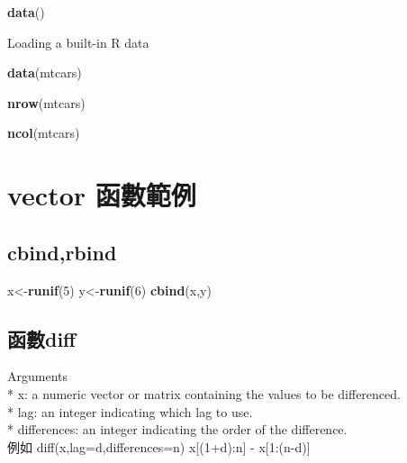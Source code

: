 \documentclass[]{book}
\newenvironment{Shaded}{\begin{snugshade}}{\end{snugshade}}
\newcommand{\KeywordTok}[1]{\textcolor[rgb]{0.13,0.29,0.53}{\textbf{#1}}}
\newcommand{\DecValTok}[1]{\textcolor[rgb]{0.00,0.00,0.81}{#1}}
\newcommand{\NormalTok}[1]{#1}
\theoremstyle{definition}
\theoremstyle{definition}
\theoremstyle{definition}
\theoremstyle{remark}
\begin{document}
\begin{Shaded}
\begin{Highlighting}[]
\KeywordTok{data}\NormalTok{()}
\end{Highlighting}
\end{Shaded}

Loading a built-in R data

\begin{Shaded}
\begin{Highlighting}[]
\KeywordTok{data}\NormalTok{(mtcars) }
\end{Highlighting}
\end{Shaded}

\begin{Shaded}
\begin{Highlighting}[]
\KeywordTok{nrow}\NormalTok{(mtcars)}
\end{Highlighting}
\end{Shaded}

\begin{Shaded}
\begin{Highlighting}[]
\KeywordTok{ncol}\NormalTok{(mtcars)}
\end{Highlighting}
\end{Shaded}

\section{vector 函數範例}\label{vector-}

\subsection{cbind,rbind}\label{cbindrbind}

\begin{Shaded}
\begin{Highlighting}[]
\NormalTok{x<-}\KeywordTok{runif}\NormalTok{(}\DecValTok{5}\NormalTok{)}
\NormalTok{y<-}\KeywordTok{runif}\NormalTok{(}\DecValTok{6}\NormalTok{)}
\KeywordTok{cbind}\NormalTok{(x,y)}
\end{Highlighting}
\end{Shaded}

\subsection{函數diff}\label{diff}

Arguments\\
* x: a numeric vector or matrix containing the values to be
differenced.\\
* lag: an integer indicating which lag to use.\\
* differences: an integer indicating the order of the difference.\\
例如 diff(x,lag=d,differences=n) x{[}(1+d):n{]} - x{[}1:(n-d){]}
\end{document}
